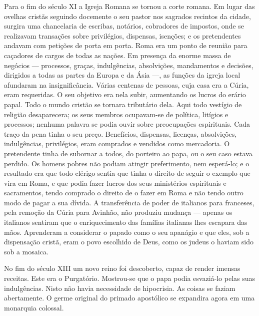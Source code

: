 \documentclass[11pt,a5paper,twoside,openany]{book}
\begin{document}
Para o fim do século XI a Igreja Romana se tornou a corte romana. Em lugar das ovelhas cristãs seguindo docemente o seu pastor nos sagrados recintos da cidade, surgira uma chancelaria de escribas, notários, cobradores de impostos, onde se realizavam transações sobre privilégios, dispensas, isenções; e os pretendentes andavam com petições de porta em porta. Roma era um ponto de reunião para caçadores de cargos de todas as nações. Em presença da enorme massa de negócios — processos, graças, indulgências, absolvições, mandamentos e decisões, dirigidos a todas as partes da Europa e da Ásia —, as funções da igreja local afundaram na insignificância. Várias centenas de pessoas, cuja casa era a Cúria, eram requeridas. O seu objetivo era nela subir, aumentando os lucros do erário papal. Todo o mundo cristão se tornara tributário dela. Aqui todo vestígio de religião desaparecera; os seus membros ocupavam-se de política, litígios e processos; nenhuma palavra se podia ouvir sobre preocupações espirituais. Cada traço da pena tinha o seu preço. Benefícios, dispensas, licenças, absolvições, indulgências, privilégios, eram comprados e vendidos como mercadoria. O pretendente tinha de subornar a todos, do porteiro ao papa, ou o seu caso estava perdido. Os homens pobres não podiam atingir preferimento, nem esperá-lo; e o resultado era que todo clérigo sentia que tinha o direito de seguir o exemplo que vira em Roma, e que podia fazer lucros dos seus ministérios espirituais e sacramentos, tendo comprado o direito de o fazer em Roma e não tendo outro modo de pagar a sua dívida. A transferência de poder de italianos para franceses, pela remoção da Cúria para Avinhão, não produziu mudança — apenas os italianos sentiram que o enriquecimento das famílias italianas lhes escapara das mãos. Aprenderam a considerar o papado como o seu apanágio e que eles, sob a dispensação cristã, eram o povo escolhido de Deus, como os judeus o haviam sido sob a mosaica.

No fim do século XIII um novo reino foi descoberto, capaz de render imensas receitas. Este era o Purgatório. Mostrou-se que o papa podia esvaziá-lo pelas suas indulgências. Nisto não havia necessidade de hipocrisia. As coisas se faziam abertamente. O germe original do primado apostólico se expandira agora em uma monarquia colossal.
\end{document}
